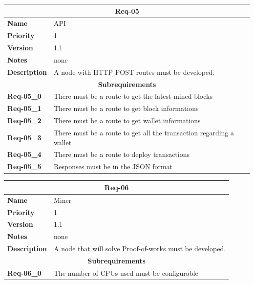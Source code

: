 \documentclass[../documentation.tex]{subfiles}
\begin{document}
\bgroup{}
\def\arraystretch{1.25}
\begin{center}
    \begin{tabular}{ |l|p{9cm}| }
        \hline
        \multicolumn{2}{|c|}{\textbf{Req-05}} \\
        \hline
        \textbf{Name} & API \\
        \hline
        \textbf{Priority} & 1 \\
        \hline
        \textbf{Version} & 1.1 \\
        \hline
        \textbf{Notes} & none \\
        \hline
        \textbf{Description} & A node with HTTP POST routes must be developed. \\
        \hline
        \multicolumn{2}{|c|}{\textbf{Subrequirements}} \\
        \hline
        \textbf{Req-05\_0} & There must be a route to get the latest mined blocks \\
        \hline
        \textbf{Req-05\_1} & There must be a route to get block informations \\
        \hline
        \textbf{Req-05\_2} & There must be a route to get wallet informations \\
        \hline
        \textbf{Req-05\_3} & There must be a route to get all the transaction regarding a wallet \\
        \hline
        \textbf{Req-05\_4} & There must be a route to deploy transactions \\
        \hline
        \textbf{Req-05\_5} & Responses must be in the JSON format \\
        \hline
    \end{tabular}
\end{center}
\egroup{}

\bgroup{}
\def\arraystretch{1.25}
\begin{center}
    \begin{tabular}{ |l|p{9cm}| }
        \hline
        \multicolumn{2}{|c|}{\textbf{Req-06}} \\
        \hline
        \textbf{Name} & Miner \\
        \hline
        \textbf{Priority} & 1 \\
        \hline
        \textbf{Version} & 1.1 \\
        \hline
        \textbf{Notes} & none \\
        \hline
        \textbf{Description} & A node that will solve Proof-of-works must be developed. \\
        \hline
        \multicolumn{2}{|c|}{\textbf{Subrequirements}} \\
        \hline
        \textbf{Req-06\_0} & The number of CPUs used must be configurable \\
        \hline
    \end{tabular}
\end{center}
\egroup{}
\end{document}

